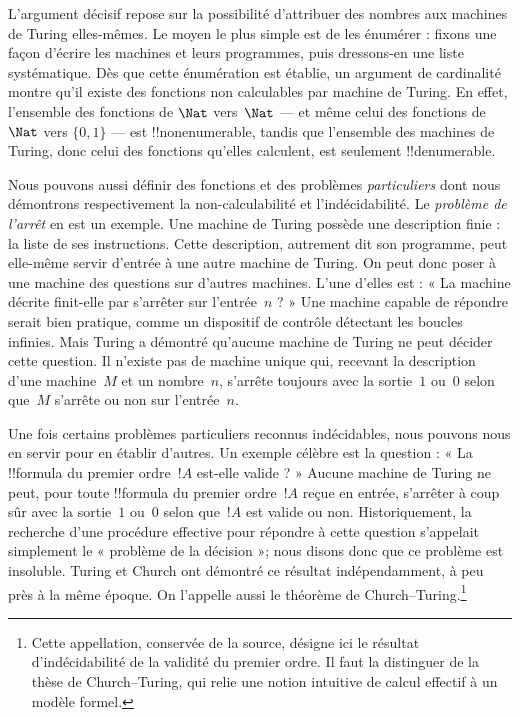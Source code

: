 \documentclass[../../../include/open-logic-section]{subfiles}
\begin{document}
L'argument décisif repose sur la possibilité d'attribuer
des nombres aux machines de Turing elles-mêmes. Le moyen
le plus simple est de les énumérer : fixons une façon
d'écrire les machines et leurs programmes, puis dressons-en
une liste systématique. Dès que cette énumération est
établie, un argument de cardinalité montre qu'il existe
des fonctions non calculables par machine de Turing.
En effet, l'ensemble des fonctions de $\Nat$ vers~$\Nat$
--- et même celui des fonctions de $\Nat$ vers
$\{0,1\}$ --- est !!{nonenumerable}, tandis que l'ensemble
des machines de Turing, donc celui des fonctions qu'elles
calculent, est seulement !!{denumerable}.

Nous pouvons aussi définir des fonctions et des problèmes
\emph{particuliers} dont nous démontrons respectivement
la non-calculabilité et l'indécidabilité. Le
\emph{problème de l'arrêt} en est un exemple. Une machine
de Turing possède une description finie : la liste de
ses instructions. Cette description, autrement dit son
programme, peut elle-même servir d'entrée à une autre
machine de Turing. On peut donc poser à une machine
des questions sur d'autres machines. L'une d'elles
est : « La machine décrite finit-elle par s'arrêter
sur l'entrée~$n$ ? » Une machine capable de répondre
serait bien pratique, comme un dispositif de contrôle
détectant les boucles infinies. Mais Turing a démontré
qu'aucune machine de Turing ne peut décider cette question.
Il n'existe pas de machine unique qui, recevant la
description d'une machine~$M$ et un nombre~$n$,
s'arrête toujours avec la sortie~$1$ ou~$0$ selon
que~$M$ s'arrête ou non sur l'entrée~$n$.

Une fois certains problèmes particuliers reconnus
indécidables, nous pouvons nous en servir pour en
établir d'autres. Un exemple célèbre est la question :
« La !!{formula} du premier ordre~$!A$ est-elle valide ? »
Aucune machine de Turing ne peut, pour toute
!!{formula} du premier ordre~$!A$ reçue en entrée,
s'arrêter à coup sûr avec la sortie~$1$ ou~$0$
selon que~$!A$ est valide ou non. Historiquement,
la recherche d'une procédure effective pour répondre
à cette question s'appelait simplement le
« problème de la décision »; nous disons donc que
ce problème est insoluble. Turing et Church ont
démontré ce résultat indépendamment, à peu près
à la même époque. On l'appelle aussi le
théorème de Church--Turing.\footnote{Cette appellation, conservée de la source, désigne ici le résultat d'indécidabilité de la validité du premier ordre. Il faut la distinguer de la thèse de Church--Turing, qui relie une notion intuitive de calcul effectif à un modèle formel.}
\end{document}
